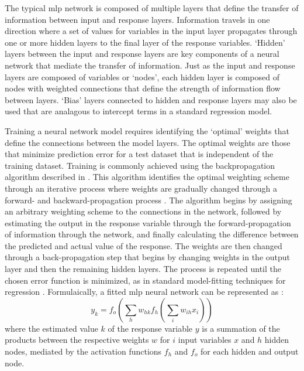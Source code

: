\documentclass[article,shortnames]{jss}\usepackage[]{graphicx}\usepackage[]{color}
\begin{document}
The typical \ac{mlp} network is composed of multiple layers that define the transfer of information between input and response layers.  Information travels in one direction where a set of values for variables in the input layer propagates through one or more hidden layers to the final layer of the response variables. `Hidden' layers between the input and response layers are key components of a neural network that mediate the transfer of information.  Just as the input and response layers are composed of variables or `nodes', each hidden layer is composed of nodes with weighted connections that define the strength of information flow between layers.  `Bias' layers connected to hidden and response layers may also be used that are analagous to intercept terms in a standard regression model.

Training a neural network model requires identifying the `optimal' weights that define the connections between the model layers.  The optimal weights are those that minimize prediction error for a test dataset that is independent of the training dataset.  Training is commonly achieved using the backpropagation algorithm described in \citep{Rumelhart86}.  This algorithm identifies the optimal weighting scheme through an iterative process where weights are gradually changed through a forward- and backward-propagation process \citep{Rumelhart86,Lek00}.  The algorithm begins by assigning an arbitrary weighting scheme to the connections in the network, followed by estimating the output in the response variable through the forward-propagation of information through the network, and finally calculating the difference between the predicted and actual value of the response.  The weights are then changed through a back-propagation step that begins by changing weights in the output layer and then the remaining hidden layers.  The process is repeated until the chosen error function is minimized, as in standard model-fitting techniques for regression \citep{Cheng94}.  Formulaically, a fitted \ac{mlp} neural network can be represented as \citep{Bishop95,Venables02}:
\begin{equation}
y_k = f_o \left(\sum\limits_{h} w_{hk}f_h \left( \sum\limits_{i} w_{ih}x_i\right) \right)
\end{equation}
where the estimated value $k$ of the response variable $y$ is a summation of the products between the respective weights $w$ for $i$ input variables $x$ and $h$ hidden nodes, mediated by the activation functions $f_h$ and $f_o$ for each hidden and output node.
\end{document}
